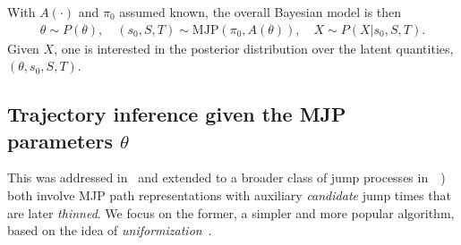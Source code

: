 With $A(\cdot)$ and $\pi_0$ assumed known, the overall Bayesian model is then 
\begin{align}
  \label{eq:bayes_model}
  \theta \sim P(\theta), \quad (s_0, S, T) \sim \text{MJP}(\pi_0, A(\theta)), \quad X \sim P(X|s_0,S,T).
\end{align}
Given $X$, one is interested in the posterior distribution over the latent quantities, $(\theta,s_0, S, T)$. 

\subsection{Trajectory inference given the MJP parameters $\theta$}
This was addressed in~\citet{RaoTeh13}  and extended to a broader class of jump processes in~\cite{RaoTeh12}~\citep[also see][]{FearnSher2006, Hobolth09, Elhaygibbssampling}) 
\citet{RaoTeh13,RaoTeh12} both involve MJP path representations with auxiliary {\em candidate} jump times that are later {\em thinned}.  
We focus on the former, a simpler and more popular algorithm, based on the idea of {\em uniformization}~\citep{Jen1953}. 

